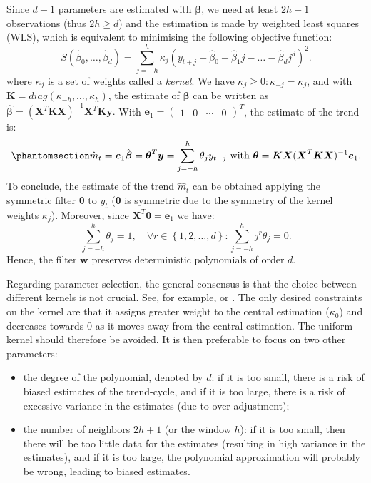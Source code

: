 \documentclass[
]{article}
\newcommand\transp[1]{{#1}^T}
\newcommand\1{\mathds{1}}
\begin{document}
Since \(d+1\) parameters are estimated with \(\boldsymbol \beta\), we
need at least \(2h+1\) observations (thus \(2h\geq d\)) and the
estimation is made by weighted least squares (WLS), which is equivalent
to minimising the following objective function: \[
S(\hat{\beta}_{0},\dots,\hat{\beta}_{d})=\sum_{j=-h}^{h}\kappa_{j}(y_{t+j}-\hat{\beta}_{0}-\hat{\beta}_{1}j-\dots-\hat{\beta}_{d}j^{d})^{2}.
\] where \(\kappa_j\) is a set of weights called a \emph{kernel}. We
have \(\kappa_j\geq 0:\kappa_{-j}=\kappa_j\), and with
\(\boldsymbol K=diag(\kappa_{-h},\dots,\kappa_{h})\), the estimate of
\(\boldsymbol \beta\) can be written as
\(\hat{\boldsymbol\beta}=(\transp{\boldsymbol X}\boldsymbol K\boldsymbol X)^{-1}\transp{\boldsymbol X}\boldsymbol K\boldsymbol y.\)
With
\(\boldsymbol e_1=\transp{\begin{pmatrix}1 &0 &\cdots&0 \end{pmatrix}}\),
the estimate of the trend is:
\begin{equation}\phantomsection\label{eq-mmsym}{
\hat{m}_{t}=\boldsymbol e_{1}\hat{\boldsymbol \beta}=\transp{\boldsymbol \theta}\boldsymbol y=\sum_{j=-h}^{h}\theta_{j}y_{t-j}\text{ with }\boldsymbol \theta=\boldsymbol K\boldsymbol X(\transp{\boldsymbol X}\boldsymbol K\boldsymbol X)^{-1}\boldsymbol e_{1}.
}\end{equation} To conclude, the estimate of the trend \(\hat{m}_{t}\)
can be obtained applying the symmetric filter \(\boldsymbol \theta\) to
\(y_t\) (\(\boldsymbol \theta\) is symmetric due to the symmetry of the
kernel weights \(\kappa_j\)). Moreover, since
\(\transp{\boldsymbol X}\boldsymbol \theta=\boldsymbol e_{1}\) we have:
\[
\sum_{j=-h}^{h}\theta_{j}=1,\quad\forall r\in\left\{1,2,\dots,d\right\}:\sum_{j=-h}^{h}j^{r}\theta_{j}=0.
\] Hence, the filter \(\boldsymbol w\) preserves deterministic
polynomials of order \(d\).

Regarding parameter selection, the general consensus is that the choice
between different kernels is not crucial. See, for example,
\textcite{cleveland1996smoothing} or \textcite{Loader1999}. The only
desired constraints on the kernel are that it assigns greater weight to
the central estimation (\(\kappa_0\)) and decreases towards 0 as it
moves away from the central estimation. The uniform kernel should
therefore be avoided. It is then preferable to focus on two other
parameters:

\begin{itemize}
\item
  the degree of the polynomial, denoted by \(d\): if it is too small,
  there is a risk of biased estimates of the trend-cycle, and if it is
  too large, there is a risk of excessive variance in the estimates (due
  to over-adjustment);
\item
  the number of neighbors \(2h+1\) (or the window \(h\)): if it is too
  small, then there will be too little data for the estimates (resulting
  in high variance in the estimates), and if it is too large, the
  polynomial approximation will probably be wrong, leading to biased
  estimates.
\end{itemize}
\end{document}
